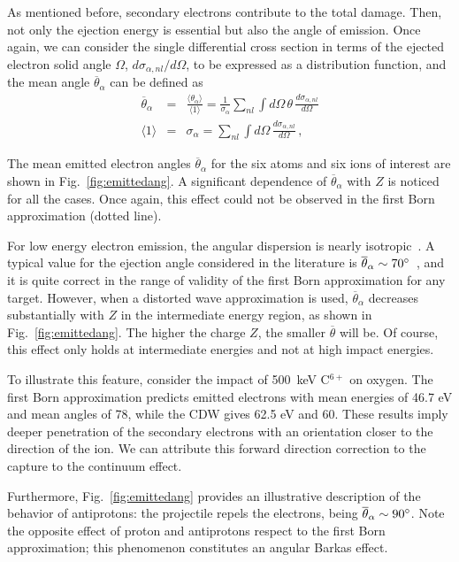 \documentclass[10pt,showpacs,showkeys,twocolumn]{revtex4}
\begin{document}
As mentioned before, secondary electrons contribute to the total damage. 
Then, not only the ejection energy is essential but also the angle 
of emission. Once again, we can consider the single differential cross 
section in terms of the ejected electron solid angle $\Omega$, 
$d\sigma_{\alpha,nl}/d\Omega$, to be expressed as a distribution function, 
and the mean angle $\overline{\theta}_{\alpha}$ can be defined as
\begin{eqnarray}
\overline{\theta}_{\alpha}&=&\frac{\langle\theta_{\alpha}\rangle}
{\langle 1\rangle}=\frac{1}{\sigma_{\alpha}}\sum\limits_{nl}
\int d\Omega\,\theta\,\frac{d\sigma_{\alpha,nl}}{d\Omega} \\
\langle 1\rangle &=&\sigma_{\alpha}=\sum\limits_{nl}\int d\Omega\,
\frac{d\sigma_{\alpha,nl}}{d\Omega}\,, 
\end{eqnarray}

The mean emitted electron angles $\overline{\theta}_{\alpha}$ for the 
six atoms and six ions of interest are shown in Fig.~\ref{fig:emittedang}.
A significant dependence of $\overline{\theta}_{\alpha}$ with $Z$ is 
noticed for all the cases. Once again, this effect could not be 
observed in the first Born approximation (dotted line).

For low energy electron emission, the angular dispersion is nearly 
isotropic~\cite{Rudd1992}.
A typical value for the ejection angle considered in the literature is 
$\overline{\theta}_{\alpha}\sim 70\degree$~\cite{surdutovic2018}, and 
it is quite correct in the range of validity of the first Born 
approximation for any target. However, when a distorted wave approximation 
is used, $\overline{\theta}_{\alpha}$ decreases substantially with $Z$ 
in the intermediate energy region, as shown in Fig.~\ref{fig:emittedang}.
The higher the charge $Z$, the smaller 
$\overline{\theta}$ will be. Of course, this effect only holds at 
intermediate energies and not at high impact energies. 

To illustrate this feature, consider the impact of 500~keV C$^{6+}$ on 
oxygen. The first Born approximation predicts emitted electrons with 
mean energies of 46.7 eV and mean angles of 78\degree, while the CDW 
gives 62.5 eV and 60\degree. 
These results imply deeper penetration of the secondary electrons with 
an orientation closer to the direction of the ion. 
We can attribute this forward direction correction to the capture to 
the continuum effect.

Furthermore, Fig.~\ref{fig:emittedang} provides an illustrative 
description of the behavior of antiprotons: the projectile repels the 
electrons, being $\overline{\theta}_{\alpha}\sim 90\degree$. Note the 
opposite effect of proton and antiprotons respect to the first Born 
approximation; this phenomenon constitutes an angular Barkas effect.
\end{document}
